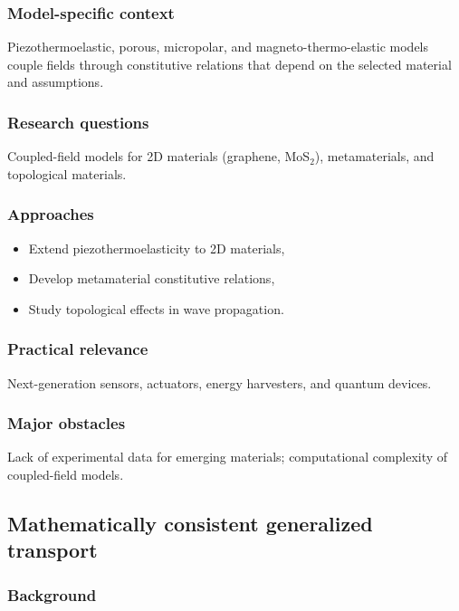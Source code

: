 \subsubsection{Model-specific context}

Piezothermoelastic, porous, micropolar, and magneto-thermo-elastic models couple fields through constitutive relations that depend on the selected material and assumptions.

\subsubsection{Research questions}

Coupled-field models for 2D materials (graphene, MoS$_2$), metamaterials, and topological materials.

\subsubsection{Approaches}

\begin{itemize}
\item Extend piezothermoelasticity to 2D materials,
\item Develop metamaterial constitutive relations,
\item Study topological effects in wave propagation.
\end{itemize}

\subsubsection{Practical relevance}

Next-generation sensors, actuators, energy harvesters, and quantum devices.

\subsubsection{Major obstacles}

Lack of experimental data for emerging materials; computational complexity of coupled-field models.

\subsection{Mathematically consistent generalized transport}
\label{sec:consistent-transport}

\subsubsection{Background}


